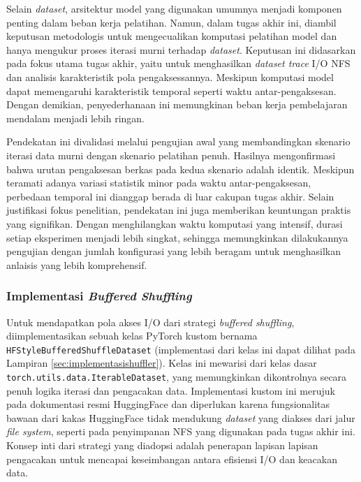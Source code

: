 Selain \textit{dataset}, arsitektur model yang digunakan umumnya menjadi komponen penting dalam beban kerja pelatihan. Namun, dalam tugas akhir ini, diambil keputusan metodologis untuk mengecualikan komputasi pelatihan model dan hanya mengukur proses iterasi murni terhadap \textit{dataset}. Keputusan ini didasarkan pada fokus utama tugas akhir, yaitu untuk menghasilkan \textit{dataset trace} I/O NFS dan analisis karakteristik pola pengaksessannya. Meskipun komputasi model dapat memengaruhi karakteristik temporal seperti waktu antar-pengaksesan. Dengan demikian, penyederhanaan ini memungkinan beban kerja pembelajaran mendalam menjadi lebih ringan.

Pendekatan ini divalidasi melalui pengujian awal yang membandingkan skenario iterasi data murni dengan skenario pelatihan penuh. Hasilnya mengonfirmasi bahwa urutan pengaksesan berkas pada kedua skenario adalah identik. Meskipun teramati adanya variasi statistik minor pada waktu antar-pengaksesan, perbedaan temporal ini dianggap berada di luar cakupan tugas akhir. Selain justifikasi fokus penelitian, pendekatan ini juga memberikan keuntungan praktis yang signifikan. Dengan menghilangkan waktu komputasi yang intensif, durasi setiap eksperimen menjadi lebih singkat, sehingga memungkinkan dilakukannya pengujian dengan jumlah konfigurasi yang lebih beragam untuk menghasilkan anlaisis yang lebih komprehensif.

\subsubsection{Implementasi \textit{Buffered Shuffling}}
\begin{sloppypar}
Untuk mendapatkan pola akses I/O dari strategi \textit{buffered shuffling}, diimplementasikan sebuah kelas PyTorch kustom bernama \texttt{HFStyleBufferedShuffleDataset} (implementasi dari kelas ini dapat dilihat pada Lampiran \ref{sec:implementasishuffler}). Kelas ini mewarisi dari kelas dasar \texttt{torch.utils.data.IterableDataset}, yang memungkinkan dikontrolnya secara penuh logika iterasi dan pengacakan data. Implementasi kustom ini merujuk pada dokumentasi resmi HuggingFace \parencite{HuggingFaceIterableDataset} dan diperlukan karena fungsionalitas bawaan dari kakas HuggingFace tidak mendukung \textit{dataset} yang diakses dari jalur \textit{file system}, seperti pada penyimpanan NFS yang digunakan pada tugas akhir ini. Konsep inti dari strategi yang diadopsi adalah penerapan lapisan lapisan pengacakan untuk mencapai keseimbangan antara efisiensi I/O dan keacakan data.
\end{sloppypar}

